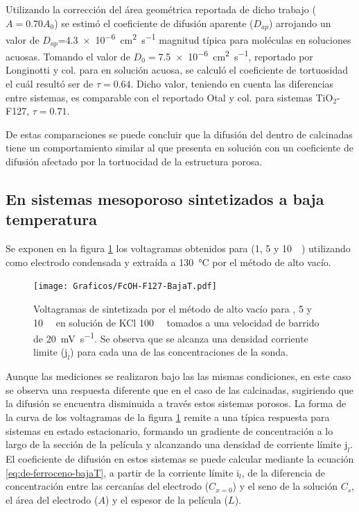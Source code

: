 	 Utilizando la corrección del área geométrica reportada de dicho trabajo ($A\!=\!0.70A_0$) se estimó el coeficiente de difusión aparente ($D_{ap}$) arrojando un valor de $D_{ap}$=\SI{4,3e-6}{\square\cm\per\second} magnitud típica para moléculas en soluciones acuosas.\cite{koryta1993,Otal2006,longinotti2007} Tomando el valor de $D_0=$\SI{7,5e-6}{\square\cm\per\second}, reportado por Longinotti y col.\cite{longinotti2007} para \fc\space en solución acuosa, se calculó el coeficiente de tortuosidad el cuál resultó ser de $\tau=0.64$. Dicho valor, teniendo en cuenta las diferencias entre sistemas, es comparable con el reportado Otal y col. para sistemas TiO$_2$-F127, $\tau=0.71$.

	  De estas comparaciones se puede concluir que la difusión del \fc\space dentro de \pdmF\space calcinadas tiene un comportamiento similar al que presenta en solución con un coeficiente de difusión afectado por la tortuocidad de la estructura porosa.
  	
	\subsection{En sistemas mesoporoso sintetizados a baja temperatura}

		Se exponen en la figura \ref{fig:fcoh_bajaT} los voltagramas obtenidos para \fc\space (1, 5 y \SI{10}{\milli\Molar}) utilizando como electrodo \pdmF\space condensada y extraída a \SI{130}{\celsius} por el método de alto vacío. 
				
					\begin{figure}[h!]
				\centering
		 	    \texttt{[image: Graficos/FcOH-F127-BajaT.pdf]}
		        \caption[Voltagrama para \fc\space en \pdm\space de baja temperatura]{Voltagramas de \pdmF\space sintetizada por el método de alto vacío para \fc{}, 5 y \SI{10}{\milli\Molar} en solución de KCl \SI{100}{\milli\Molar} tomados a una velocidad de barrido de \SI{20}{\milli\volt\per\second}. Se observa que se alcanza una densidad corriente limite ($\text{j}_l$) para cada una de las concentraciones de la sonda.}
		        \label{fig:fcoh_bajaT}
		      	\end{figure}

		Aunque las mediciones se realizaron bajo las las mismas condiciones, en este caso se observa una respuesta diferente que en el caso de las \pdmF\space calcinadas, sugiriendo que la difusión se encuentra disminuida a través estos sistemas porosos. La forma de la curva de los voltagramas de la figura \ref{fig:fcoh_bajaT} remite a una típica respuesta para sistemas en estado estacionario, formando un gradiente de concentración a lo largo de la sección de la película y alcanzando una densidad de corriente límite $\text{j}_l$. 
		El coeficiente de difusión en estos sistemas se puede calcular mediante la ecuación \ref{eq:de-ferroceno-bajaT}, a partir de la corriente límite $\text{i}_l$, de la diferencia de concentración entre las cercanías del electrodo ($C_{x=0}$) y el seno de la solución $C_s$, el área del electrodo ($A$) y el espesor de la película ($L$).

